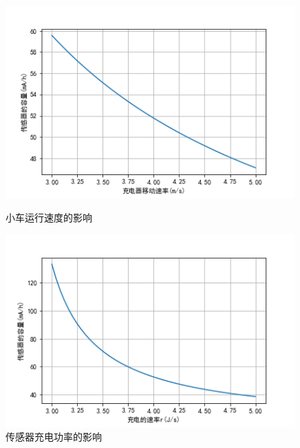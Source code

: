 \documentclass{whutmod}
\begin{document}
\begin{figure}[H]	
	\begin{minipage}[t]{0.48\textwidth}
		\centering
		\includegraphics[width=0.99\textwidth]{speed.png}	
		
		\caption{小车运行速度的影响}
	\end{minipage}
	\qquad
	\begin{minipage}[t]{0.48\textwidth}
		\centering
		\includegraphics[width=0.99\textwidth]{chargeSpeed.png}
		
		\caption{传感器充电功率的影响}	
	\end{minipage}
	\label{fig:enhance}
	
\end{figure}
\end{document}
